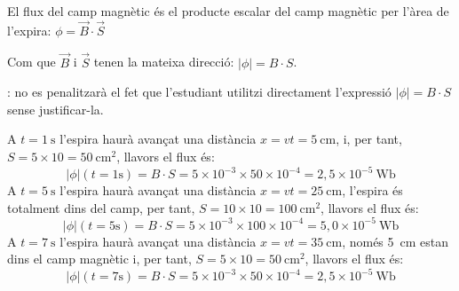 \begin{solapartat}
 El flux del camp magnètic és el producte escalar del camp magnètic per l'àrea de l'expira: $\phi = \vec{B}\cdot\vec{S}$

Com que $\vec{B}$ i $\vec{S}$ tenen la mateixa direcció: $|\phi| = B\cdot S$.

: no es penalitzarà el fet que l'estudiant utilitzi directament l'expressió $|\phi| = B\cdot S$ sense justificar-la.

 A $t = 1\ \mathrm{s}$ l'espira haurà avançat una distància $x = vt = 5\ \mathrm{cm}$, i, per tant, $S = 5\times 10 = 50\ \mathrm{cm^2}$, llavors el flux és:
\[ |\phi|(t = 1\mathrm{s}) = B\cdot S = 5\times 10^{-3}\times 50\times 10^{-4} = 2,5\times 10^{-5}\ \mathrm{Wb} \]
 A $t = 5\ \mathrm{s}$ l'espira haurà avançat una distància $x = vt = 25\ \mathrm{cm}$, l'espira és totalment dins del camp, per tant, $S = 10\times 10 = 100\ \mathrm{cm^2}$, llavors el flux és:
\[ |\phi|(t = 5\mathrm{s}) = B\cdot S = 5\times 10^{-3}\times 100\times 10^{-4} = 5,0\times 10^{-5}\ \mathrm{Wb} \]
 A $t = 7\ \mathrm{s}$ l'espira haurà avançat una distància $x = vt = 35\ \mathrm{cm}$, només 5~cm estan dins el camp magnètic i, per tant, $S = 5\times 10 = 50\ \mathrm{cm^2}$, llavors el flux és:
\[ |\phi|(t = 7\mathrm{s}) = B\cdot S = 5\times 10^{-3}\times 50\times 10^{-4} = 2,5\times 10^{-5}\ \mathrm{Wb} \]
\end{solapartat}

